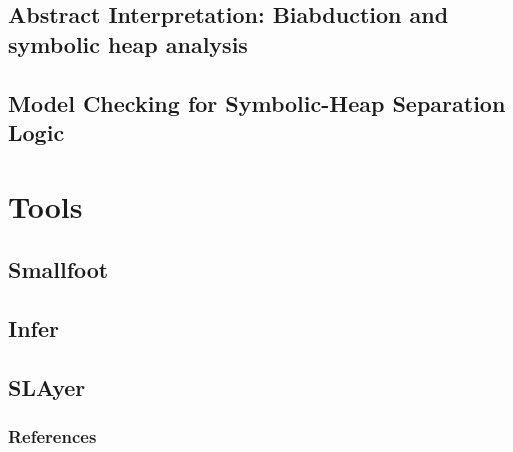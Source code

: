 \documentclass{beamer}
\begin{document}
    \subsection{Abstract Interpretation: Biabduction and symbolic heap  analysis}
    \subsection{Model Checking for Symbolic-Heap Separation Logic }
    \section{Tools}
    \subsection{Smallfoot}
    \subsection{Infer}
    \subsection{SLAyer}
    \begin{frame}[allowframebreaks]
     
        \nocite{*}
        \frametitle{References}
        
        
    \end{frame}
\end{document}
